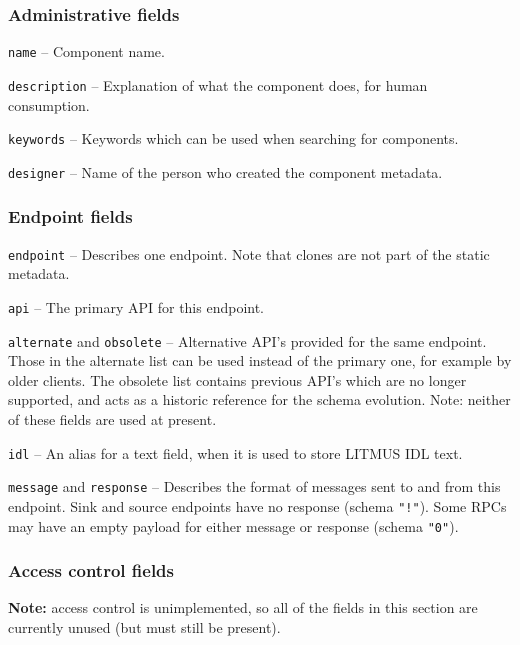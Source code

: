 \documentclass[12pt,a4paper,twoside]{article}
\renewcommand{\_}{\texttt{\symbol{95}}}
\begin{document}
\subsubsection{Administrative fields}

\begin{bulletlist}
\item \verb^name^ -- Component name.
\item \verb^description^ -- Explanation of what the component does, for
		human consumption.
\item \verb^keywords^ -- Keywords which can be used when searching for
		components.
\item \verb^designer^ -- Name of the person who created the component metadata.
\end{bulletlist}

\subsubsection{Endpoint fields}

\begin{bulletlist}
\item \verb^endpoint^ -- Describes one endpoint. Note that clones
		are not part of the static metadata.
\item \verb^api^ -- The primary API for this endpoint.
\item \verb^alternate^ and \verb^obsolete^ -- Alternative API's provided
		for the same endpoint. Those in the alternate list can be used
		instead of the primary one, for example by older clients.
		The obsolete list contains previous API's which are no longer
		supported, and acts as a historic reference for the schema evolution.
		Note: neither of these fields are used at present.
\item \verb^idl^ -- An alias for a text field, when it is used to
		store LITMUS IDL text.
\item \verb^message^ and \verb^response^ -- Describes the format of
		messages sent to and from this endpoint.
		Sink and source endpoints have no response (schema \verb^"!"^).
		Some RPCs may have an empty payload for either message or response
		(schema \verb^"0"^).
\end{bulletlist}

\subsubsection{Access control fields}

\textbf{Note:} access control is unimplemented, so all of the fields in this
section are currently unused (but must still be present).
\end{document}
